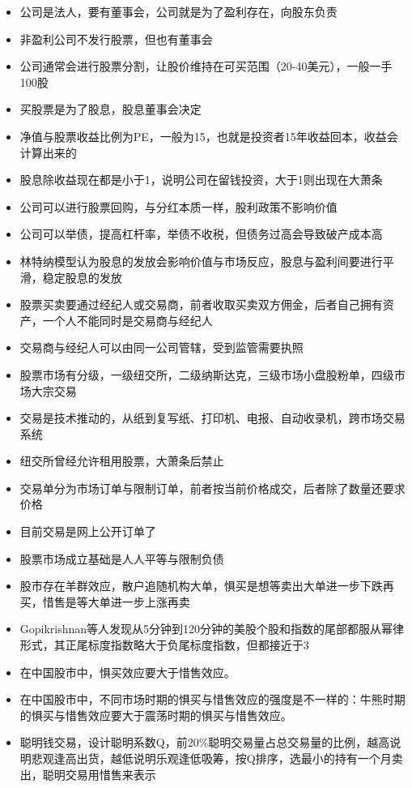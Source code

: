 \documentclass[]{book}
\providecommand{\tightlist}{%
  \setlength{\itemsep}{0pt}\setlength{\parskip}{0pt}}
\begin{document}
\begin{itemize}
\tightlist
\item
  公司是法人，要有董事会，公司就是为了盈利存在，向股东负责
\item
  非盈利公司不发行股票，但也有董事会
\item
  公司通常会进行股票分割，让股价维持在可买范围（20-40美元），一般一手100股
\item
  买股票是为了股息，股息董事会决定
\item
  净值与股票收益比例为PE，一般为15，也就是投资者15年收益回本，收益会计算出来的
\item
  股息除收益现在都是小于1，说明公司在留钱投资，大于1则出现在大萧条
\item
  公司可以进行股票回购，与分红本质一样，股利政策不影响价值
\item
  公司可以举债，提高杠杆率，举债不收税，但债务过高会导致破产成本高
\item
  林特纳模型认为股息的发放会影响价值与市场反应，股息与盈利间要进行平滑，稳定股息的发放
\item
  股票买卖要通过经纪人或交易商，前者收取买卖双方佣金，后者自己拥有资产，一个人不能同时是交易商与经纪人
\item
  交易商与经纪人可以由同一公司管辖，受到监管需要执照
\item
  股票市场有分级，一级纽交所，二级纳斯达克，三级市场小盘股粉单，四级市场大宗交易
\item
  交易是技术推动的，从纸到复写纸、打印机、电报、自动收录机，跨市场交易系统
\item
  纽交所曾经允许租用股票，大萧条后禁止
\item
  交易单分为市场订单与限制订单，前者按当前价格成交，后者除了数量还要求价格
\item
  目前交易是网上公开订单了
\item
  股票市场成立基础是人人平等与限制负债
\item
  股市存在羊群效应，散户追随机构大单，惧买是想等卖出大单进一步下跌再买，惜售是等大单进一步上涨再卖
\item
  Gopikrishnan等人发现从5分钟到120分钟的美股个股和指数的尾部都服从幂律形式，其正尾标度指数略大于负尾标度指数，但都接近于3
\item
  在中国股市中，惧买效应要大于惜售效应。
\item
  在中国股市中，不同市场时期的惧买与惜售效应的强度是不一样的：牛熊时期的惧买与惜售效应要大于震荡时期的惧买与惜售效应。
\item
  聪明钱交易，设计聪明系数Q，前20\%聪明交易量占总交易量的比例，越高说明悲观逢高出货，越低说明乐观逢低吸筹，按Q排序，选最小的持有一个月卖出，聪明交易用惜售来表示
\end{itemize}
\end{document}
